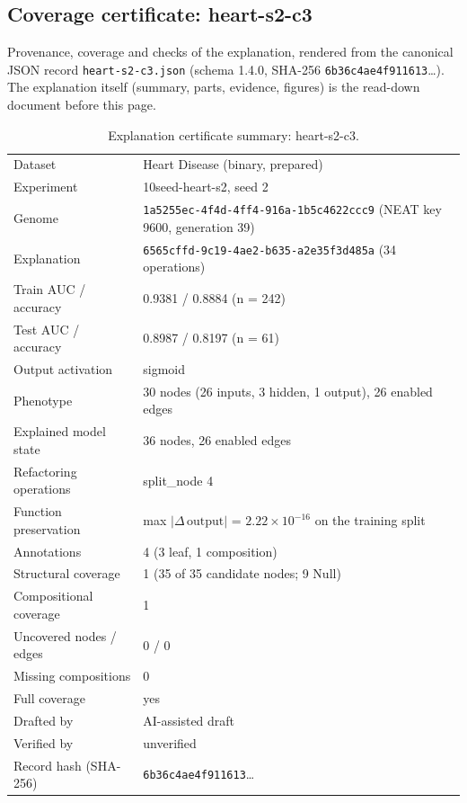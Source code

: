\providecommand{\explaneatcertdir}[1]{}
\begin{drafted}
\section{Coverage certificate: heart-s2-c3}\label{app:heart-s2-c3:sec}
Provenance, coverage and checks of the explanation, rendered from the canonical JSON record \texttt{heart-s2-c3.json} (schema 1.4.0, SHA-256 \texttt{6b36c4ae4f911613}\ldots). The explanation itself (summary, parts, evidence, figures) is the read-down document before this page.

\begin{table}[htbp]
\centering\small
\begin{tabularx}{\linewidth}{@{}lX@{}}
\toprule
Dataset & Heart Disease (binary, prepared) \\
Experiment & 10seed-heart-s2, seed 2 \\
Genome & \texttt{1a5255ec-4f4d-4ff4-916a-1b5c4622ccc9} (NEAT key 9600, generation 39) \\
Explanation & \texttt{6565cffd-9c19-4ae2-b635-a2e35f3d485a} (34 operations) \\
Train AUC / accuracy & 0.9381 / 0.8884 (n = 242) \\
Test AUC / accuracy & 0.8987 / 0.8197 (n = 61) \\
Output activation & sigmoid \\
Phenotype & 30 nodes (26 inputs, 3 hidden, 1 output), 26 enabled edges \\
Explained model state & 36 nodes, 26 enabled edges \\
Refactoring operations & split\_\allowbreak{}node 4 \\
Function preservation & max $|\Delta\,\mathrm{output}|$ = $2.22\times 10^{-16}$ on the training split \\
Annotations & 4 (3 leaf, 1 composition) \\
Structural coverage & 1 (35 of 35 candidate nodes; 9 Null) \\
Compositional coverage & 1 \\
Uncovered nodes / edges & 0 / 0 \\
Missing compositions & 0 \\
Full coverage & yes \\
Drafted by & AI-assisted draft \\
Verified by & unverified \\
Record hash (SHA-256) & \texttt{6b36c4ae4f911613}\ldots \\
\bottomrule
\end{tabularx}
\caption{Explanation certificate summary: heart-s2-c3.}
\label{app:heart-s2-c3:summary}
\end{table}

\end{drafted}
